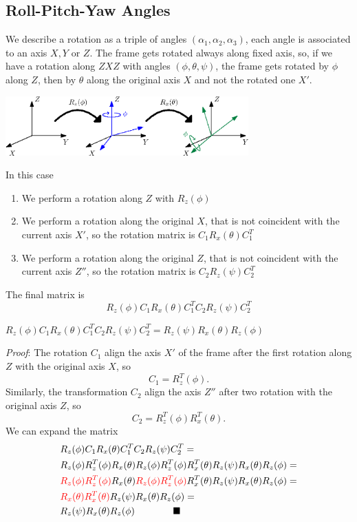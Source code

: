 \documentclass[10pt, letterpaper]{report}
\begin{document}
\subsection{Roll-Pitch-Yaw Angles}
We describe a rotation as a triple of angles $(\alpha_1,\alpha_2,\alpha_3)$, each angle is associated to an axis $X,Y$ or $Z$. The frame gets rotated always along fixed axis, so, if we have a rotation along $ZXZ$ with angles $(\phi,\theta,\psi)$, the frame gets rotated by $\phi$ along $Z$, then by $\theta$ along the original axis $X$ and not the rotated one $X'$.\begin{center}
    \includegraphics[width=0.7\textwidth ]{images/rpy_angles.eps}
\end{center}
In this case\begin{enumerate}
    \item We perform a rotation along $Z$ with $R_z(\phi)$
    \item We perform a rotation along the original $X$, that is not coincident with the current axis $X'$, so the rotation matrix is $C_1R_x(\theta)C_1^T$
    \item We perform a rotation along the original $Z$, that is not coincident with the current axis $Z''$, so the rotation matrix is $C_2R_z(\psi)C_2^T$
\end{enumerate}
The final matrix is \begin{equation}
    R_z(\phi)C_1R_x(\theta)C_1^TC_2R_z(\psi)C_2^T
\end{equation}
\begin{theorem}
    $R_z(\phi)C_1R_x(\theta)C_1^TC_2R_z(\psi)C_2^T=R_z(\psi)R_x(\theta)R_z(\phi)$
\end{theorem}
\textit{Proof}: The rotation $C_1$ align the  axis $X'$ of the frame after the first rotation along $Z$ with the original axis $X$, so $$C_1=R^T_z(\phi).$$ Similarly, the transformation $C_2$ align the axis $Z''$ after two rotation with the original axis $Z$, so $$C_2=R^T_z(\phi)R^T_x(\theta).$$
We can expand the matrix \begin{align}
     &R_z(\phi)C_1R_x(\theta)C_1^TC_2R_z(\psi)C_2^T=\\ 
    &R_z(\phi)R^T_z(\phi)R_x(\theta)R_z(\phi)R^T_z(\phi)R^T_x(\theta)R_z(\psi)R_x(\theta)R_z(\phi)=\\ 
&\color{red}R_z(\phi)R^T_z(\phi)\color{black}R_x(\theta)\color{red}R_z(\phi)R^T_z(\phi)\color{black}R^T_x(\theta)R_z(\psi)R_x(\theta)R_z(\phi)=\\ 
&\color{red}R_x(\theta)R^T_x(\theta)\color{black}R_z(\psi)R_x(\theta)R_z(\phi)=\\ 
&R_z(\psi)R_x(\theta)R_z(\phi) \ \ \ \ \ \ \ \ \ \ \ \ \blacksquare
\end{align}
\end{document}
